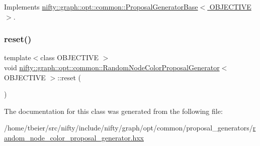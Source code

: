 Implements \hyperlink{classnifty_1_1graph_1_1opt_1_1common_1_1ProposalGeneratorBase_abb7b02d650049f52733b3f2dc81bb395}{nifty\+::graph\+::opt\+::common\+::\+Proposal\+Generator\+Base$<$ O\+B\+J\+E\+C\+T\+I\+V\+E $>$}.

\mbox{\label{classnifty_1_1graph_1_1opt_1_1common_1_1RandomNodeColorProposalGenerator_a655c003dfd00e4022478633ac21cd48c}} 
\subsubsection{\texorpdfstring{reset()}{reset()}}
{\footnotesize\ttfamily template$<$class O\+B\+J\+E\+C\+T\+I\+VE $>$ \\
void \hyperlink{classnifty_1_1graph_1_1opt_1_1common_1_1RandomNodeColorProposalGenerator}{nifty\+::graph\+::opt\+::common\+::\+Random\+Node\+Color\+Proposal\+Generator}$<$ O\+B\+J\+E\+C\+T\+I\+VE $>$\+::reset (\begin{DoxyParamCaption}{ }\end{DoxyParamCaption})\hspace{0.3cm}{\ttfamily [inline]}}



The documentation for this class was generated from the following file\+:\begin{DoxyCompactItemize}
\item 
/home/tbeier/src/nifty/include/nifty/graph/opt/common/proposal\+\_\+generators/\hyperlink{random__node__color__proposal__generator_8hxx}{random\+\_\+node\+\_\+color\+\_\+proposal\+\_\+generator.\+hxx}\end{DoxyCompactItemize}
